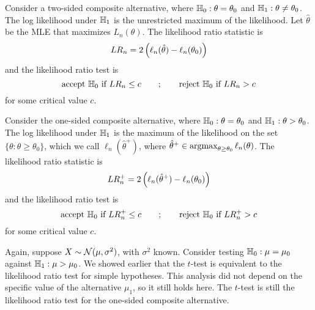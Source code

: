 \documentclass[10pt]{article}
\begin{document}
\begin{example}
	Consider a two-sided composite alternative, where $\mathbb{H}_0: \theta = \theta_0$ and $\mathbb{H}_1 : \theta \ne \theta_0$. The log likelihood under $\mathbb{H}_1$ is the unrestricted maximum of the likelihood. Let $\hat{\theta}$ be the MLE that maximizes $L_n(\theta)$. The likelihood ratio statistic is
	\[
	LR_n = 2 \left( \ell_n(\hat{\theta}) - \ell_n(\theta_0)\right)
	\]
	and the likelihood ratio test is
	\[
	\text{accept }\mathbb{H}_0\text{ if }LR_n \le c \qquad ; \qquad \text{reject }\mathbb{H}_0\text{ if }LR_n> c
	\]
	for some critical value $c$.
\end{example}

\begin{example}
	Consider the one-sided composite alternative, where $\mathbb{H}_0: \theta = \theta_0$ and $\mathbb{H}_1 : \theta > \theta_0$. The log likelihood under $\mathbb{H}_1$ is the maximum of the likelihood on the set $\{\theta : \theta \ge \theta_0\}$, which we call $\ell_n(\hat{\theta}^+)$, where $\hat{\theta}^+ \in \mathop{\rm argmax}_{\theta \ge \theta_0} \ell_n(\theta)$. The likelihood ratio statistic is
	\[
	LR_n^+ = 2 \left( \ell_n(\hat{\theta}^+) - \ell_n(\theta_0)\right)
	\]
	and the likelihood ratio test is
	\[
	\text{accept }\mathbb{H}_0\text{ if }LR_n^+ \le c \qquad ; \qquad \text{reject }\mathbb{H}_0\text{ if }LR_n^+> c
	\]
	for some critical value $c$.
\end{example}

\begin{example}
	Again, suppose $X \sim \mathcal{N}(\mu,\sigma^2)$, with $\sigma^2$ known. Consider testing $\mathbb{H}_0: \mu = \mu_0$ against $\mathbb{H}_1 : \mu > \mu_0$. We showed earlier that the $t$-test is equivalent to the likelihood ratio test for simple hypotheses. This analysis did not depend on the specific value of the alternative $\mu_1$, so it still holds here. The $t$-test is still the likelihood ratio test for the one-sided composite alternative.
\end{example}
\end{document}
